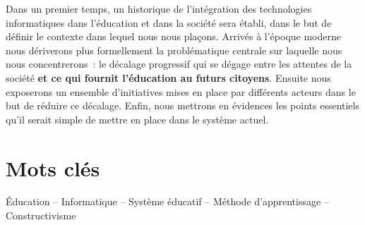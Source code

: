 Dans un premier temps, un historique de l'intégration des technologies informatiques dans l'éducation et dans la société sera établi, dans le but de définir le contexte dans lequel nous nous plaçons. Arrivés à l'époque moderne nous dériverons plus formellement la problématique centrale sur laquelle nous nous concentrerons~: le décalage progressif qui se dégage entre les attentes de la société \textbf{et ce qui fournit l'éducation au futurs citoyens}. Ensuite nous exposerons un ensemble d'initiatives mises en place par différents acteurs dans le but de réduire ce décalage. Enfin, nous mettrons en évidences les points essentiels qu'il serait simple de mettre en place dans le système actuel.
\vfill
\section*{Mots clés}
Éducation -- Informatique -- Système éducatif -- Méthode d'apprentissage -- Constructivisme